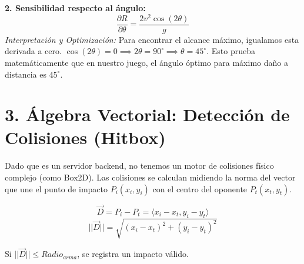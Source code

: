 \documentclass[12pt,a4paper]{article}
\begin{document}
\textbf{2. Sensibilidad respecto al ángulo:}
\begin{equation}
\frac{\partial R}{\partial \theta} = \frac{2v^2 \cos(2\theta)}{g}
\end{equation}
\textit{Interpretación y Optimización:} Para encontrar el alcance máximo, igualamos esta derivada a cero. $\cos(2\theta) = 0 \implies 2\theta = 90^\circ \implies \theta = 45^\circ$. Esto prueba matemáticamente que en nuestro juego, el ángulo óptimo para máximo daño a distancia es $45^\circ$.

\section{3. Álgebra Vectorial: Detección de Colisiones (Hitbox)}
Dado que es un servidor backend, no tenemos un motor de colisiones físico complejo (como Box2D). Las colisiones se calculan midiendo la norma del vector que une el punto de impacto $P_i(x_i, y_i)$ con el centro del oponente $P_t(x_t, y_t)$.

\begin{equation}
\vec{D} = P_i - P_t = \langle x_i - x_t, y_i - y_t \rangle
\end{equation}
\begin{equation}
||\vec{D}|| = \sqrt{(x_i - x_t)^2 + (y_i - y_t)^2}
\end{equation}

Si $||\vec{D}|| \leq Radio_{arma}$, se registra un impacto válido.

\begin{center}
\end{center}

\newpage

\end{document}
